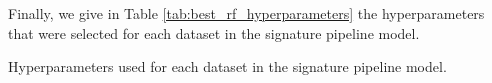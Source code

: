 \documentclass{article}
\theoremstyle{definition}
\theoremstyle{remark}
\begin{document}
	Finally, we give in Table \ref{tab:best_rf_hyperparameters} the hyperparameters that were selected for each dataset in the signature pipeline model.

	\begin{table}[h]
		\small
		\centering
		\caption{Hyperparameters used for each dataset in the signature pipeline model.}
		\label{tab:best_rf_hyperparameters}
        
	\end{table}
\end{document}
